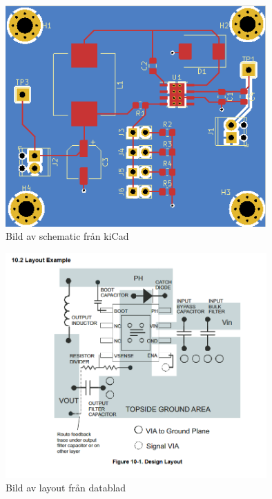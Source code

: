 \documentclass{article}
\begin{document}
\begin{figure}[htp]
    \centering
    \includegraphics[width=10cm]{img/print.png}
    \caption{Bild av schematic från kiCad}
\end{figure}

\begin{figure}[htp]
    \centering
    \includegraphics[width=10cm]{img/layout.png}
    \caption{Bild av layout från datablad}
\end{figure}
\end{document}
